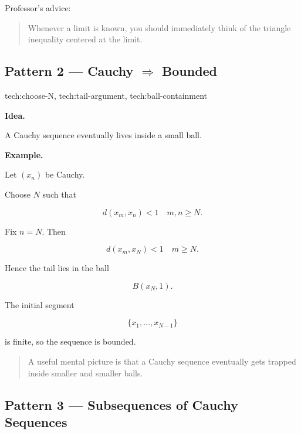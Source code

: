 \bigskip

Professor's advice:

\begin{quote}
Whenever a limit is known, you should immediately think of the triangle
inequality centered at the limit.
\end{quote}

\bigskip

\subsection*{Pattern 2 — Cauchy $\Rightarrow$ Bounded}

\begin{remark*}[Techniques]
tech:choose-N, tech:tail-argument, tech:ball-containment
\end{remark*}

\textbf{Idea.}

A Cauchy sequence eventually lives inside a small ball.

\textbf{Example.}

Let \((x_n)\) be Cauchy.

Choose \(N\) such that

\[
d(x_m,x_n) < 1
\quad
m,n\ge N.
\]

Fix \(n=N\). Then

\[
d(x_m,x_N)<1
\quad m\ge N.
\]

Hence the tail lies in the ball

\[
B(x_N,1).
\]

The initial segment

\[
\{x_1,\dots,x_{N-1}\}
\]

is finite, so the sequence is bounded.

\bigskip

\begin{quote}
A useful mental picture is that a Cauchy sequence eventually gets trapped
inside smaller and smaller balls.
\end{quote}

\subsection*{Pattern 3 — Subsequences of Cauchy Sequences}

